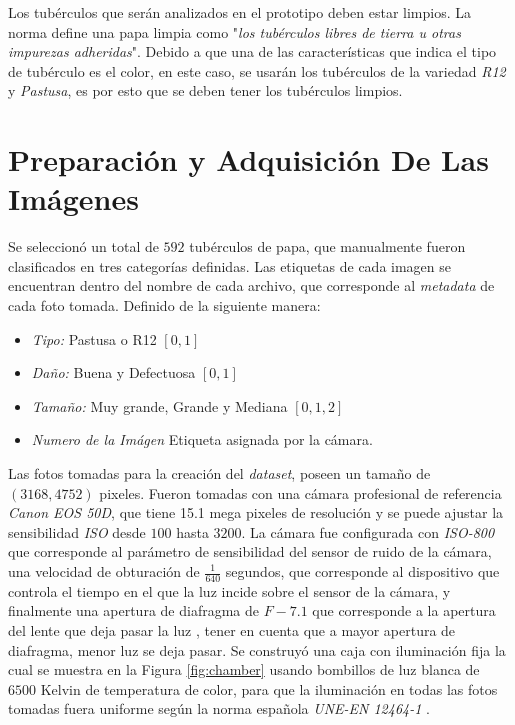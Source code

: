 Los tubérculos que serán analizados en el prototipo deben estar limpios. La norma define una papa limpia como "\textit{los tubérculos libres de tierra u otras impurezas adheridas}". Debido a que una de las características que indica el tipo de tubérculo es el color, en este caso, se usarán los tubérculos de la variedad \textit{R12} y \textit{Pastusa}, es por esto que se deben tener los tubérculos limpios. 

\newpage
\section{Preparación y Adquisición De Las Imágenes}

Se seleccionó un total de $592$ tubérculos de papa, que manualmente fueron clasificados en tres categorías definidas. Las etiquetas de cada imagen se encuentran dentro del nombre de cada archivo, que corresponde al \textit{metadata} de cada foto tomada. Definido de la siguiente manera:

\begin{itemize}
	\item \textit{Tipo:} Pastusa o R12 $[0,1]$
	\item \textit{Daño:} Buena y Defectuosa $[0,1]$
	\item \textit{Tamaño:} Muy grande, Grande y Mediana $[0,1,2]$
	\item \textit{Numero de la Imágen} Etiqueta asignada por la cámara.
\end{itemize}	

Las fotos tomadas para la creación del \textit{dataset}, poseen un tamaño de $(3168, 4752)$ pixeles. Fueron tomadas con una cámara profesional de referencia \textit{Canon EOS 50D}, que tiene 15.1 mega pixeles de resolución y se puede ajustar la sensibilidad \textit{ISO} desde $100$ hasta $3200$. La cámara fue configurada con \textit{ISO-800} que corresponde al parámetro de sensibilidad del sensor de ruido de la cámara, una velocidad de obturación de $\frac{1}{640}$ segundos, que corresponde al dispositivo que controla el tiempo en el que la luz incide sobre el sensor de la cámara, y finalmente una apertura de diafragma de $F-7.1$ que corresponde a la apertura del lente que deja pasar la luz \cite{Camara}, tener en cuenta que a mayor apertura de diafragma, menor luz se deja pasar. Se construyó una caja con iluminación fija la cual se muestra en la Figura \ref{fig:chamber} usando bombillos de luz blanca de $6500$ Kelvin de temperatura de color, para que la iluminación en todas las fotos tomadas fuera uniforme según la norma española \textit{UNE-EN 12464-1} \cite{normaespanola}.

